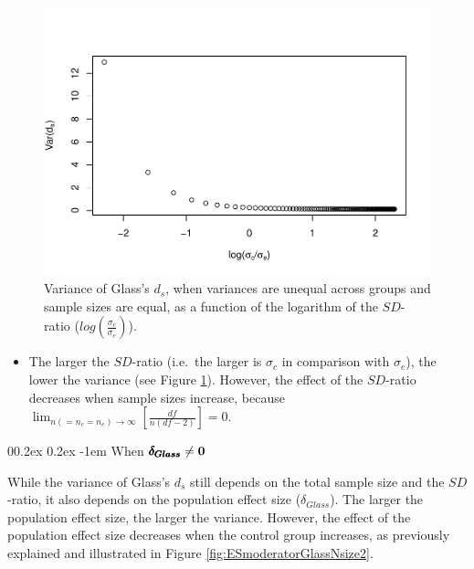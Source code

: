\documentclass[
  english,
  man,mask]{apa6}
\makeatletter
\providecommand{\tightlist}{%
  \setlength{\itemsep}{0pt}\setlength{\parskip}{0pt}}
\let\oldparagraph\paragraph
\renewcommand{\paragraph}[1]{\oldparagraph{#1}\mbox{}}
\renewcommand{\paragraph}{\@startsection{paragraph}{4}{\parindent}%
  {0\baselineskip \@plus 0.2ex \@minus 0.2ex}%
  {-1em}%
  {\normalfont\normalsize\bfseries\itshape\typesectitle}}
\makeatother
\begin{document}
\begin{figure}
\centering
\includegraphics{Theoretical-Variance-of-all-estimators-as-a-function-of-population-parameters_files/figure-latex/varglasshetbalSDratio2-1.pdf}
\caption{\label{fig:varglasshetbalSDratio2}Variance of Glass's \(d_s\), when variances are unequal across groups and sample sizes are equal, as a function of the logarithm of the \(SD\)-ratio (\(log \left( \frac{\sigma_c}{\sigma_e} \right)\)).}
\end{figure}

\begin{itemize}
\tightlist
\item
  The larger the \(SD\)-ratio (i.e.~the larger is \(\sigma_c\) in comparison with \(\sigma_e\)), the lower the variance (see Figure \ref{fig:varglasshetbalSDratio2}). However, the effect of the \(SD\)-ratio decreases when sample sizes increase, because \(\lim_{n(=n_c=n_e)\rightarrow \infty}\left[\frac{df}{n(df-2)} \right]=0\).
\end{itemize}

\hypertarget{when-bf-pmbdelta_glass-neq-0-1}{%
\paragraph{\texorpdfstring{When \(\bf \pmb{\delta_{Glass}} \neq 0\)}{When \textbackslash bf \textbackslash pmb\{\textbackslash delta\_\{Glass\}\} \textbackslash neq 0}}\label{when-bf-pmbdelta_glass-neq-0-1}}

While the variance of Glass's \(d_s\) still depends on the total sample size and the \(SD\)-ratio, it also depends on the population effect size (\(\delta_{Glass}\)). The larger the population effect size, the larger the variance. However, the effect of the population effect size decreases when the control group increases, as previously explained and illustrated in Figure \ref{fig:ESmoderatorGlassNsize2}.
\end{document}
